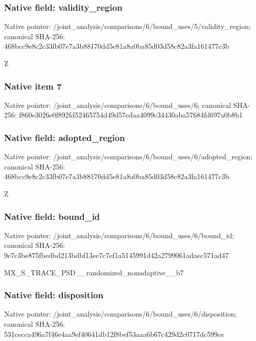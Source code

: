 \documentclass[10pt,a4paper]{article}
\begin{document}
\subsubsection{Native field: validity\_\allowbreak{}region}
Native pointer: /joint\_\allowbreak{}analysis/comparisons/6/bound\_\allowbreak{}uses/5/validity\_\allowbreak{}region; canonical SHA-256: 468bcc9e8c2c33fb07e7a3b88170dd5e81a8a0ba85d03d58c82a3fa161477c3b

\begingroup\raggedright\sloppy Z\par\endgroup

\subsubsection{Native item 7}
Native pointer: /joint\_\allowbreak{}analysis/comparisons/6/bound\_\allowbreak{}uses/6; canonical SHA-256: f860e3026e0f892fd52465754d49d57edaa4099c34430aba57684fd697a0b8b1

\subsubsection{Native field: adopted\_\allowbreak{}region}
Native pointer: /joint\_\allowbreak{}analysis/comparisons/6/bound\_\allowbreak{}uses/6/adopted\_\allowbreak{}region; canonical SHA-256: 468bcc9e8c2c33fb07e7a3b88170dd5e81a8a0ba85d03d58c82a3fa161477c3b

\begingroup\raggedright\sloppy Z\par\endgroup

\subsubsection{Native field: bound\_\allowbreak{}id}
Native pointer: /joint\_\allowbreak{}analysis/comparisons/6/bound\_\allowbreak{}uses/6/bound\_\allowbreak{}id; canonical SHA-256: 9e7c3be875fbedbd213bdbf13ee7c7ef1a5145991d42a2799061adaec571ad47

\begingroup\raggedright\sloppy MX\_\allowbreak{}S\_\allowbreak{}TRACE\_\allowbreak{}PSD\_\allowbreak{}\_\allowbreak{}randomized\_\allowbreak{}nonadaptive\_\allowbreak{}\_\allowbreak{}b7\par\endgroup

\subsubsection{Native field: disposition}
Native pointer: /joint\_\allowbreak{}analysis/comparisons/6/bound\_\allowbreak{}uses/6/disposition; canonical SHA-256: 531cecca496a7f46e4aa9ef40641db12f8bef53aaa6b67c429d2c0717dc599ce
\end{document}
